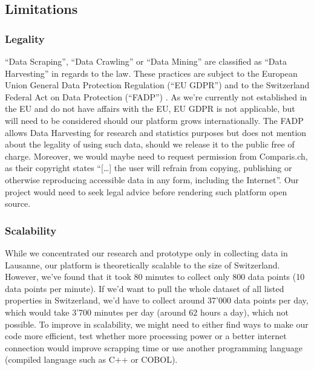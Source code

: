 \documentclass[main]{subfiles}
\begin{document}
\subsection{Limitations}

\subsubsection{Legality}
“Data Scraping”, “Data Crawling” or “Data Mining” are classified as “Data Harvesting” in regards to the law. These practices are subject to the European Union General Data Protection Regulation (“EU GDPR”) and to the Switzerland Federal Act on Data Protection (“FADP”) \cite{conradWebDataCollection2019}. As we're currently not established in the EU and do not have affairs with the EU, EU GDPR is not applicable, but will need to be considered should our platform grows internationally.
The FADP allows Data Harvesting for research and statistics purposes but does not mention about the legality of using such data, should we release it to the public free of charge. Moreover, we would maybe need to request permission from Comparis.ch, as their copyright states “[…] the user will refrain from copying, publishing or otherwise reproducing accessible data in any form, including the Internet”. Our project would need to seek legal advice before rendering such platform open source.

\subsubsection{Scalability}
While we concentrated our research and prototype only in collecting data in Lausanne, our platform is theoretically scalable to the size of Switzerland. However, we've found that it took 80 minutes to collect only 800 data points (10 data points per minute). 
If we'd want to pull the whole dataset of all listed properties in Switzerland, we'd have to collect around 37'000 data points per day, which would take 3'700 minutes per day (around 62 hours a day), which not possible. 
To improve in scalability, we might need to either find ways to make our code more efficient, test whether more processing power or a better internet connection would improve scrapping time or use another programming language (compiled language such as C++ or COBOL).
\end{document}
